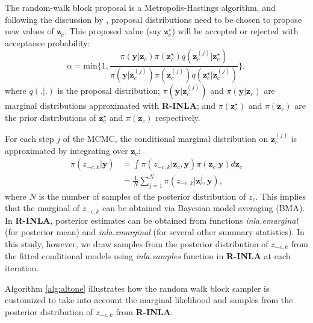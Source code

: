 \documentclass[
]{article}
\begin{document}
The random-walk block proposal is a Metropolis-Hastings algorithm, and
following the discussion by \citet{gomez2018markov}, proposal
distributions need to be chosen to propose new values of
\(\mathbf{z}_c\). This proposed value (say \(\mathbf{z}_c^{\star}\))
will be accepted or rejected with acceptance probability:
\begin{equation}\label{rwmhar}
\alpha = \text{min}\bigg \{ 1, \frac{\pi(\mathbf{y}| \mathbf{z}_{c}) \pi(\mathbf{z}_c^{\star}) q(\mathbf{z}_{c}^{(j)}| \mathbf{z}_c^{\star})}{\pi(\mathbf{y}| \mathbf{z}_{c}^{(j)})\pi(\mathbf{z}_c^{(j)}) q(\mathbf{z}_c^{\star}|\mathbf{z}_{c}^{(j)})}    \bigg \},
\end{equation} where \(q(.|.)\) is the proposal distribution;
\(\pi(\mathbf{y}| \mathbf{z}_{c}^{(j)})\) and
\(\pi(\mathbf{y}| \mathbf{z}_{c})\) are marginal distributions
approximated with \textbf{R-INLA}; and \(\pi(\mathbf{z}_c^{\star})\) and
\(\pi(\mathbf{z}_c)\) are the prior distributions of
\(\mathbf{z}_c^{\star}\) and \(\pi(\mathbf{z}_c)\) respectively.

For each step \(j\) of the MCMC, the conditional marginal distribution
on \(\mathbf{z}_{c}^{(j)}\) is approximated by integrating over
\(\mathbf{z}_{c}\): \begin{equation}\label{marginalzcmcmc}
\begin{split}
\pi(z_{-c,k}|\mathbf{y}) &= \int \pi(z_{-c,k}|\mathbf{z}_c, \mathbf{y})\pi(\mathbf{z}_c| \mathbf{y})d\mathbf{z}_c\\
&= \frac{1}{N} \sum_{j = 1}^{N} \pi(z_{-c,k}|\mathbf{z}^{j}_c, \mathbf{y}),
\end{split}
\end{equation} where \(N\) is the number of samples of the posterior
distribution of \(z_c\). This implies that the marginal of \(z_{-c,k}\)
can be obtained via Bayesian model averaging (BMA). In \textbf{R-INLA},
posterior estimates can be obtained from functions
\textit{inla.emarginal} (for posterior mean) and \textit{inla.zmarginal}
(for several other summary statistics). In this study, however, we draw
samples from the posterior distribution of \(z_{-c,k}\) from the fitted
conditional models using \textit{inla.samples} function in
\textbf{R-INLA} at each iteration.

Algorithm \ref{alg:altone} illustrates how the random walk block sampler
is customized to take into account the marginal likelihood and samples
from the posterior distribution of \(z_{-c,k}\) from \textbf{R-INLA}.
\end{document}

